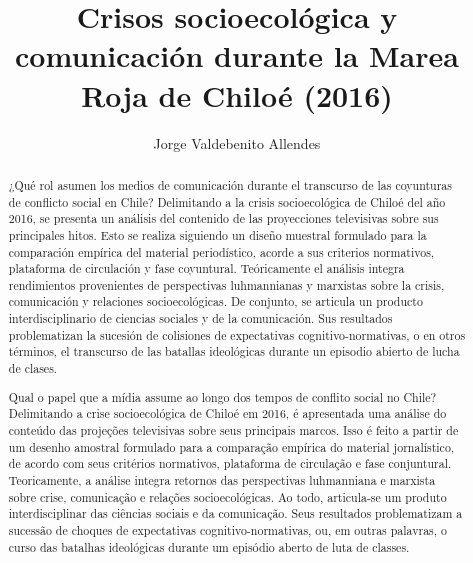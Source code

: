 \documentclass{textolivre}
\title{Crisos socioecológica y comunicación durante la Marea Roja de Chiloé (2016)}
\author[1]{Jorge Valdebenito Allendes}
\affil[1]{Universidad de Valparaíso, Chile. Email: \url{jorge.valdebenito@postgrado.uv.cl}. \orcid{0000-0003-3249-1855}}
\begin{document}
\maketitle

\begin{poliabstract}
\begin{abstract}
¿Qué rol asumen los medios de comunicación durante el transcurso de las
coyunturas de conflicto social en Chile? Delimitando a la crisis socioecológica de Chiloé
del año 2016, se presenta un análisis del contenido de las proyecciones televisivas sobre
sus principales hitos. Esto se realiza siguiendo un diseño muestral formulado para la
comparación empírica del material periodístico, acorde a sus criterios normativos,
plataforma de circulación y fase coyuntural. Teóricamente el análisis integra rendimientos
provenientes de perspectivas luhmannianas y marxistas sobre la crisis, comunicación y
relaciones socioecológicas. De conjunto, se articula un producto interdisciplinario de
ciencias sociales y de la comunicación. Sus resultados problematizan la sucesión de
colisiones de expectativas cognitivo-normativas, o en otros términos, el transcurso de las
batallas ideológicas durante un episodio abierto de lucha de clases.

\end{abstract}

\begin{portuguese}
\begin{abstract}
Qual o papel que a mídia assume ao longo dos tempos de conflito social no
Chile? Delimitando a crise socioecológica de Chiloé em 2016, é apresentada uma análise
do conteúdo das projeções televisivas sobre seus principais marcos. Isso é feito a partir
de um desenho amostral formulado para a comparação empírica do material jornalístico,
de acordo com seus critérios normativos, plataforma de circulação e fase conjuntural.
Teoricamente, a análise integra retornos das perspectivas luhmanniana e marxista sobre
crise, comunicação e relações socioecológicas. Ao todo, articula-se um produto
interdisciplinar das ciências sociais e da comunicação. Seus resultados problematizam a
sucessão de choques de expectativas cognitivo-normativas, ou, em outras palavras, o
curso das batalhas ideológicas durante um episódio aberto de luta de classes.

\end{abstract}
\end{portuguese}


\end{poliabstract}
\end{document}
